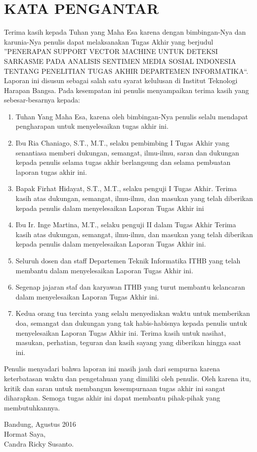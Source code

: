 \chapter*{KATA PENGANTAR}
{\raggedleft Terima kasih kepada Tuhan yang Maha Esa karena dengan bimbingan-Nya dan karunia-Nya penulis dapat melaksanakan Tugas Akhir yang berjudul \textquotedblright PENERAPAN SUPPORT VECTOR MACHINE UNTUK DETEKSI SARKASME PADA ANALISIS SENTIMEN MEDIA SOSIAL INDONESIA TENTANG PENELITIAN TUGAS AKHIR DEPARTEMEN INFORMATIKA\textquotedblleft. Laporan ini disusun sebagai salah satu syarat kelulusan di Institut Teknologi Harapan Bangsa. Pada kesempatan ini penulis menyampaikan terima kasih yang sebesar-besarnya kepada:} \\
\begin{enumerate}
\item Tuhan Yang Maha Esa, karena oleh bimbingan-Nya penulis selalu mendapat pengharapan untuk menyelesaikan tugas akhir ini.
\item Ibu Ria Chaniago, S.T., M.T., selaku pembimbing I Tugas Akhir yang  senantiasa memberi dukungan, semangat, ilmu-ilmu, saran dan dukungan kepada penulis selama tugas akhir berlangsung dan selama pembuatan laporan tugas akhir ini.
\item Bapak Firhat Hidayat, S.T., M.T., selaku penguji I Tugas Akhir. Terima kasih atas dukungan, semangat, ilmu-ilmu, dan masukan yang telah diberikan kepada penulis dalam menyelesaikan Laporan Tugas Akhir ini
\item Ibu Ir. Inge Martina, M.T., selaku penguji II dalam Tugas Akhir Terima kasih atas dukungan, semangat, ilmu-ilmu, dan masukan yang telah diberikan kepada penulis dalam menyelesaikan Laporan Tugas Akhir ini.
\item Seluruh dosen dan staff Departemen Teknik Informatika ITHB yang telah membantu dalam menyelesaikan Laporan Tugas Akhir ini.
\item Segenap jajaran staf dan karyawan ITHB yang turut membantu kelancaran dalam menyelesaikan Laporan Tugas Akhir ini.
\item Kedua orang tua tercinta yang selalu menyediakan waktu untuk memberikan doa, semangat dan dukungan yang tak habis-habisnya kepada penulis untuk menyelesaikan Laporan Tugas Akhir ini. Terima kasih untuk nasihat, masukan, perhatian, teguran dan kasih sayang yang diberikan hingga saat ini.
\\
\end{enumerate}
Penulis menyadari bahwa laporan ini masih jauh dari sempurna karena keterbatasan waktu dan pengetahuan yang dimiliki oleh penulis. Oleh karena itu, kritik dan saran untuk membangun kesempurnaan tugas akhir ini sangat diharapkan. Semoga tugas akhir ini dapat membantu pihak-pihak yang membutuhkannya.\\[1.5cm]  
\hfill
{\begin{flushright} Bandung, Agustus 2016\\[1.5cm] Hormat  Saya,\\ Candra Ricky Susanto.\end{flushright}}
\newpage